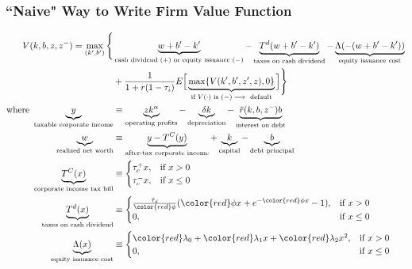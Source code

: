 \documentclass[usenames,dvipsnames, handout]{beamer}
\begin{document}
\begin{frame}
\frametitle{``Naive" Way to Write Firm Value Function}
\scriptsize
\begin{align*}
V(k, b, z, z^-) =
\max_{(k', b')} \Bigg\{ 
& \underbrace{w + b' - k'}_{\text{cash dividend } (+) \text{ or equity issuance } (-)} - \underbrace{T^d(w + b' - k')}_{\text{taxes on cash dividend}} - \underbrace{\Lambda(-(w + b' - k'))}_{\text{equity issuance cost}} \\
&+ \frac{1}{1+r(1-\tau_i)} E\Big[\underbrace{\max\{ V(k', b', z', z), 0\}}_{\text{if }V(\cdot) \text{ is } (-) \implies\text{ default}}\Big] \Bigg\} \\
\text{where }
\underbrace{y}_{\text{taxable corporate income}} &\equiv \underbrace{z k^\alpha}_{\text{operating profits}} - \underbrace{\delta k}_{\text{depreciation}} - \underbrace{\tilde r(k, b, z^-) b}_{\text{interest on debt}} \\
\underbrace{w}_{\text{realized net worth}} &\equiv \underbrace{y - T^C(y)}_{\text{after-tax corporate income}}+ \underbrace{k}_{\text{capital}}  - \underbrace{b}_{\text{debt principal}} \\
\underbrace{T^C(x)}_{\text{corporate income tax bill}} &\equiv 
\begin{cases} 
\tau_c^+ x, & \text{if }x > 0 \\
\tau_c^- x, & \text{if }x \le 0
\end{cases}\\
\underbrace{T^d(x)}_{\text{taxes on cash dividend}} &\equiv 
\begin{cases}
\frac{\bar \tau_d}{{\color{red}\phi}}({\color{red}\phi} x + e^{-{\color{red}\phi} x} - 1), & \text{if }x > 0 \\
0,& \text{if } x \le 0
\end{cases} \\
\underbrace{\Lambda(x)}_{\text{equity issuance cost}} &\equiv 
\begin{cases} 
{\color{red}\lambda_0} + {\color{red}\lambda_1} x + {\color{red}\lambda_2} x^2, & \text{if }x > 0 \\
0, & \text{if }x \le 0
\end{cases}
\end{align*}
\end{frame}
\end{document}
